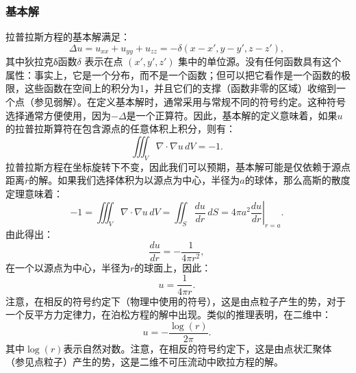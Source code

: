 \subsubsection{基本解}  
拉普拉斯方程的基本解满足：
\[
\Delta u = u_{xx} + u_{yy} + u_{zz} = -\delta (x - x', y - y', z - z'),~
\]
其中狄拉克δ函数\( \delta \) 表示在点 \( (x', y', z') \) 集中的单位源。没有任何函数具有这个属性：事实上，它是一个分布，而不是一个函数；但可以把它看作是一个函数的极限，这些函数在空间上的积分为1，并且它们的支撑（函数非零的区域）收缩到一个点（参见弱解）。在定义基本解时，通常采用与常规不同的符号约定。这种符号选择通常方便使用，因为\( -\Delta \)是一个正算符。因此，基本解的定义意味着，如果\( u \)的拉普拉斯算符在包含源点的任意体积上积分，则有：
\[
\iiint_V \nabla \cdot \nabla u\, dV = -1.~
\]
拉普拉斯方程在坐标旋转下不变，因此我们可以预期，基本解可能是仅依赖于源点距离\( r \)的解。如果我们选择体积为以源点为中心，半径为\( a \)的球体，那么高斯的散度定理意味着：
\[
-1 = \iiint_V \nabla \cdot \nabla u\, dV = \iint_S \frac{du}{dr}\, dS = \left. 4\pi a^2 \frac{du}{dr} \right|_{r=a}.~
\]
由此得出：
\[
\frac{du}{dr} = -\frac{1}{4\pi r^2},~
\]
在一个以源点为中心，半径为\( r \)的球面上，因此：
\[
u = \frac{1}{4\pi r}.~
\]
注意，在相反的符号约定下（物理中使用的符号），这是由点粒子产生的势，对于一个反平方力定律力，在泊松方程的解中出现。类似的推理表明，在二维中：
\[
u = -\frac{\log(r)}{2\pi}.~
\]
其中\( \log(r) \)表示自然对数。注意，在相反的符号约定下，这是由点状汇聚体（参见点粒子）产生的势，这是二维不可压流动中欧拉方程的解。
